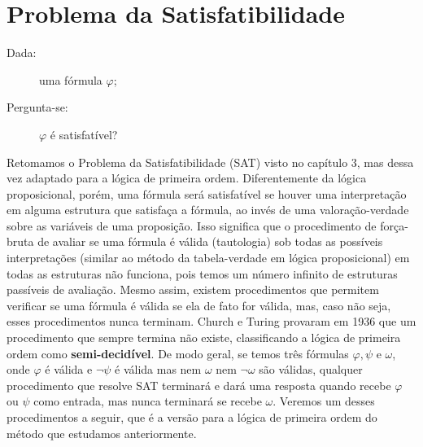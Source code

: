 \chapter{Problema da Satisfatibilidade}

\begin{description}
    \item[Dada:] uma fórmula $\varphi$;
    \item[Pergunta-se:] $\varphi$ é satisfatível? 
\end{description}

Retomamos o Problema da Satisfatibilidade (SAT) visto no capítulo 3, mas dessa vez adaptado para a lógica de primeira ordem. Diferentemente da lógica proposicional, porém, uma fórmula será satisfatível se houver uma interpretação em alguma estrutura que satisfaça a fórmula, ao invés de uma valoração-verdade sobre as variáveis de uma proposição. Isso significa que o procedimento de força-bruta de avaliar se uma fórmula é válida (tautologia) sob todas as possíveis interpretações (similar ao método da tabela-verdade em lógica proposicional) em todas as estruturas não funciona, pois temos um número infinito de estruturas passíveis de avaliação. Mesmo assim, existem procedimentos que permitem verificar se uma fórmula é válida se ela de fato for válida, mas, caso não seja, esses procedimentos nunca terminam. Church e Turing provaram em 1936 que um procedimento que sempre termina não existe, classificando a lógica de primeira ordem como \textbf{semi-decidível}. De modo geral, se temos três fórmulas $\varphi, \psi$ e $\omega$, onde $\varphi$ é válida e $\neg \psi$ é válida mas nem $\omega$ nem $\neg \omega$ são válidas, qualquer procedimento que resolve SAT terminará e dará uma resposta quando recebe $\varphi$ ou $\psi$ como entrada, mas nunca terminará se recebe $\omega$. Veremos um desses procedimentos a seguir, que é a versão para a lógica de primeira ordem do método que estudamos anteriormente. 